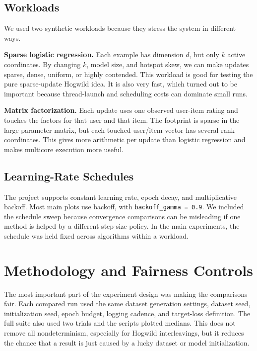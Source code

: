 \documentclass[11pt]{article}
\begin{document}
\subsection{Workloads}

We used two synthetic workloads because they stress the system in different ways.

\textbf{Sparse logistic regression.} Each example has dimension \(d\), but only \(k\) active coordinates. By changing \(k\), model size, and hotspot skew, we can make updates sparse, dense, uniform, or highly contended. This workload is good for testing the pure sparse-update Hogwild idea. It is also very fast, which turned out to be important because thread-launch and scheduling costs can dominate small runs.

\textbf{Matrix factorization.} Each update uses one observed user-item rating and touches the factors for that user and that item. The footprint is sparse in the large parameter matrix, but each touched user/item vector has several rank coordinates. This gives more arithmetic per update than logistic regression and makes multicore execution more useful.

\subsection{Learning-Rate Schedules}

The project supports constant learning rate, epoch decay, and multiplicative backoff. Most main plots use backoff, with \texttt{backoff\_gamma = 0.9}. We included the schedule sweep because convergence comparisons can be misleading if one method is helped by a different step-size policy. In the main experiments, the schedule was held fixed across algorithms within a workload.

\section{Methodology and Fairness Controls}

The most important part of the experiment design was making the comparisons fair. Each compared run used the same dataset generation settings, dataset seed, initialization seed, epoch budget, logging cadence, and target-loss definition. The full suite also used two trials and the scripts plotted medians. This does not remove all nondeterminism, especially for Hogwild interleavings, but it reduces the chance that a result is just caused by a lucky dataset or model initialization.
\end{document}
